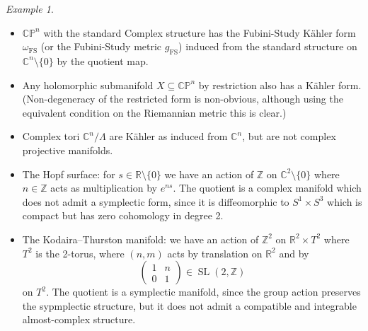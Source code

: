 \documentclass[a4paper]{article}
\theoremstyle{definition}
\theoremstyle{remark}
\newtheorem*{example}{Example}
\DeclareMathOperator{\SL}{SL}
\newcommand{\FS}{\text{FS}}
\newcommand{\CP}{\mathbb{CP}}
\newcommand{\Z}{\mathbb{Z}}
\newcommand{\R}{\mathbb{R}}
\newcommand{\C}{\mathbb{C}}
\begin{document}
\begin{example}
    ~
    \begin{itemize}
        \item $\CP^n$ with the standard Complex structure has the Fubini-Study
            K\"ahler form $\omega_\FS$ (or the Fubini-Study metric $g_\FS$)
            induced from the standard structure on $\C^n\setminus\{0\}$ by the
            quotient map.

        \item Any holomorphic submanifold $X\subseteq\CP^n$ by restriction also
            has a K\"ahler form. (Non-degeneracy of the restricted form is
            non-obvious, although using the equivalent condition on the
            Riemannian metric this is clear.)

        \item Complex tori $\C^n/\Lambda$ are K\"ahler as induced from $\C^n$,
            but are not complex projective manifolds.

        \item The Hopf surface: for $s\in\R\setminus\{0\}$ we have an action of
            $\Z$ on $\C^2\setminus\{0\}$ where $n\in\Z$ acts as multiplication
            by $e^{ns}$. The quotient is a complex manifold which does not admit
            a symplectic form, since it is diffeomorphic to $S^1\times S^3$
            which is compact but has zero cohomology in degree 2.

        \item The Kodaira--Thurston manifold: we have an action of $\Z^2$ on
            $\R^2\times T^2$ where $T^2$ is the 2-torus, where $(n,m)$ acts by
            translation on $\R^2$ and by
            \begin{equation*}
                \begin{pmatrix}
                    1 & n \\ 0 & 1
                \end{pmatrix} \in \SL(2,\Z)
            \end{equation*}
            on $T^2$. The quotient is a symplectic manifold, since the group
            action preserves the sypmplectic structure, but it does not admit a
            compatible and integrable almost-complex structure.


\end{itemize}
\end{example}
\end{document}
